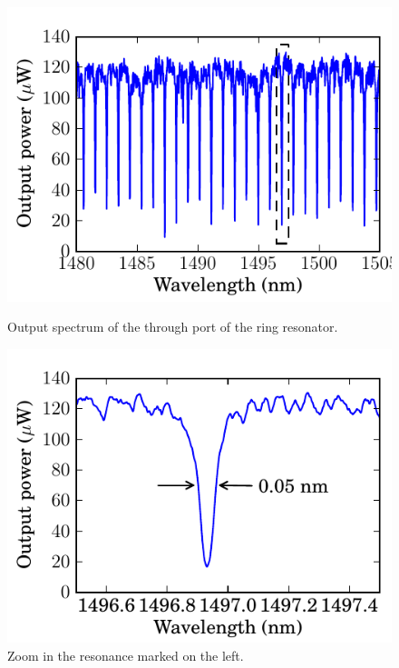 \documentclass[12pt,twoside,english]{book}
\renewcommand{\~}{\perispomeni}%
\numberwithin{equation}{section}
\numberwithin{figure}{section}
\begin{document}
\begin{figure}[h]
\begin{minipage}[t]{0.49\columnwidth}%
	\includegraphics{ring-through}
	\caption{Output spectrum of the through port of the ring resonator.}
	\label{fig:ring through spectrum}
\end{minipage}\hfill{}%
\begin{minipage}[t]{0.49\columnwidth}%
	\includegraphics{ring-through-zoom}
	\caption{Zoom in the resonance marked on the left.}
	\label{fig:resonance zoom}
\end{minipage}
\end{figure}
\end{document}
